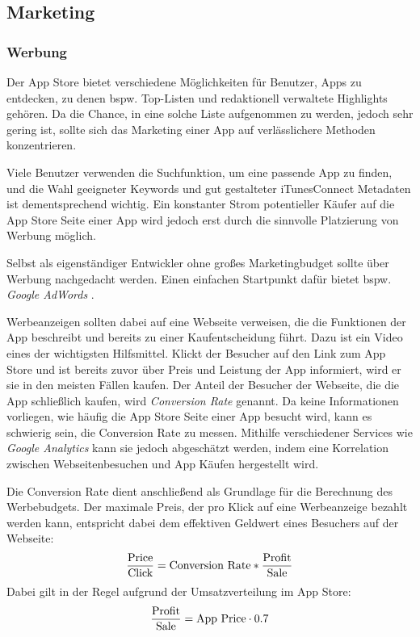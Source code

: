 \documentclass[parskip=half, final]{scrreprt}
\begin{document}
\subsection{Marketing}

\subsubsection{Werbung}

Der App Store bietet verschiedene Möglichkeiten für Benutzer, Apps zu entdecken, zu denen bspw. Top-Listen und redaktionell verwaltete Highlights gehören. Da die Chance, in eine solche Liste aufgenommen zu werden, jedoch sehr gering ist, sollte sich das Marketing einer App auf verlässlichere Methoden konzentrieren.

Viele Benutzer verwenden die Suchfunktion, um eine passende App zu finden, und die Wahl geeigneter Keywords und gut gestalteter iTunesConnect Metadaten ist dementsprechend wichtig. Ein konstanter Strom potentieller Käufer auf die App Store Seite einer App wird jedoch erst durch die sinnvolle Platzierung von Werbung möglich.

Selbst als eigenständiger Entwickler ohne großes Marketingbudget sollte über Werbung nachgedacht werden. Einen einfachen Startpunkt dafür bietet bspw. \emph{Google AdWords }.

Werbeanzeigen sollten dabei auf eine Webseite verweisen, die die Funktionen der App beschreibt und bereits zu einer Kaufentscheidung führt. Dazu ist ein Video eines der wichtigsten Hilfsmittel. Klickt der Besucher auf den Link zum App Store und ist bereits zuvor über Preis und Leistung der App informiert, wird er sie in den meisten Fällen kaufen. Der Anteil der Besucher der Webseite, die die App schließlich kaufen, wird \emph{Conversion Rate} genannt. Da keine Informationen vorliegen, wie häufig die App Store Seite einer App besucht wird, kann es schwierig sein, die Conversion Rate zu messen. Mithilfe verschiedener Services wie \emph{Google Analytics } kann sie jedoch abgeschätzt werden, indem eine Korrelation zwischen Webseitenbesuchen und App Käufen hergestellt wird.

Die Conversion Rate dient anschließend als Grundlage für die Berechnung des Werbebudgets. Der maximale Preis, der pro Klick auf eine Werbeanzeige bezahlt werden kann, entspricht dabei dem effektiven Geldwert eines Besuchers auf der Webseite:
\begin{equation}
\frac{\textnormal{Price}}{\textnormal{Click}} = \textnormal{Conversion Rate} * \frac{\textnormal{Profit}}{\textnormal{Sale}}
\end{equation}
Dabei gilt in der Regel aufgrund der Umsatzverteilung im App Store:
\begin{equation}
\frac{\textnormal{Profit}}{\textnormal{Sale}} = \textnormal{App Price} \cdot 0.7
\end{equation}
\end{document}
